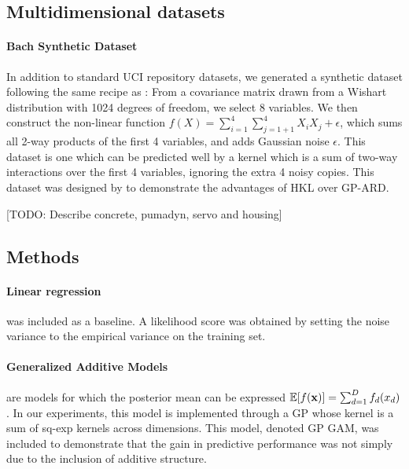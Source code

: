 \documentclass[twoside]{article}
\begin{document}
\subsection{Multidimensional datasets}

\paragraph{Bach Synthetic Dataset}
In addition to standard UCI repository datasets, we generated a synthetic dataset following the same recipe as \cite{DBLP:journals/corr/abs-0909-0844}: From a covariance matrix drawn from a Wishart distribution with 1024 degrees of freedom, we select 8 variables.
We then construct the non-linear function $f(X) = \sum_{i=1}^4 \sum_{j=1+1}^4 X_i X_j + \epsilon$, which sums all 2-way products of the first 4 variables, and adds Gaussian noise $\epsilon$.
This dataset is one which can be predicted well by a kernel which is a sum of two-way interactions over the first 4 variables, ignoring the extra 4 noisy copies.
%
This dataset was designed by \cite{DBLP:journals/corr/abs-0909-0844} to demonstrate the advantages of HKL over GP-ARD. 


[TODO: Describe concrete, pumadyn, servo and housing]

\subsection{Methods}

\paragraph{Linear regression} was included as a baseline. A likelihood score was obtained by setting the noise variance to the empirical variance on the training set.

\paragraph{Generalized Additive Models} are models for which the posterior mean can be expressed $\mathbb{E}[f({\bf{x}})] = \sum_{d=1}^D f_d(x_d)$.  
In our experiments, this model is implemented through a GP whose kernel is a sum of sq-exp kernels across dimensions.  
This model, denoted GP GAM, was included to demonstrate that the gain in predictive performance was not simply due to the inclusion of additive structure.
\end{document}
